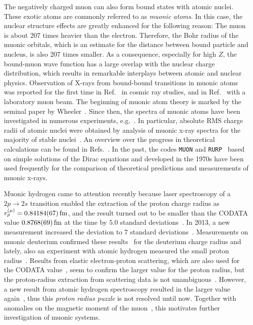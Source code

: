 The negatively charged muon can also form bound states with atomic nuclei. These exotic atoms are commonly referred to as \textit{muonic atoms}. In this case, the nuclear structure effects are greatly enhanced for the following reason: The muon is about 207 times heavier than the electron. Therefore, the Bohr radius of the muonic orbitals, which is an estimate for the distance between bound particle and nucleus, is also 207 times smaller. As a consequence, especially for high $Z$, the bound-muon wave function has a large overlap with the nuclear charge distribution, which results in remarkable interplays between atomic and nuclear physics. Observation of X-rays from bound-bound transitions in muonic atoms was reported for the first time in Ref.~\cite{chang1949} in cosmic ray studies, and in Ref.~\cite{fitch1953} with a laboratory muon beam. The beginning of muonic atom theory is marked by the seminal paper by Wheeler~\cite{wheeler1949}.  Since then, the spectra of muonic atoms have been investigated in numerous experiments, e.g.~\cite{hitlin1970,zehnder1975,powers1976,Yamazaki1978,tanaka1983,tanaka1984,tanaka1984_2,Bergem1988,
powers1977}. In particular, absolute RMS charge radii of atomic nuclei were obtained by analysis of muonic x-ray spectra for the majority of stable nuclei~\cite{FRICKE1995}. An overview over the progress in theoretical calculations can be found in Refs.~\cite{BorieRinker1982,Devons1995,wu1969}. In the past, the codes \texttt{MUON} and \texttt{RURP}~\cite{rinker1979} based on simple solutions of the Dirac equations and developed in the 1970s have been used frequently for the comparison of theoretical predictions and measurements of muonic x-rays. 

Muonic hydrogen came to attention recently because laser spectroscopy of a \mbox{\small{$2p\rightarrow 2s$}} transition enabled the extraction of the proton charge radius as $r_p^{(\mu)}=0.84184(67)\,\rm{fm}$, and the result turned out to be smaller than the CODATA value $0.8768(69)\,\rm{fm}$ at the time by $5.0$ standard deviations~\cite{Pohl2010}. In 2013, a new measurement increased the deviation to 7 standard deviations~\cite{antognini2013}. Measurements on muonic deuterium confirmed these results~\cite{pohl2016} for the deuterium charge radius and lately, also an experiment with atomic hydrogen measured the small proton radius~\cite{beyer2017}.
Results from elastic electron-proton scattering, which are also used for the CODATA value~\cite{codata}, seem to confirm the larger value for the proton radius, but the proton-radius extraction from scattering data is not unambiguous~\cite{arrington2015}. However, a new result from atomic hydrogen spectroscopy resulted in the larger value again~\cite{fleurbaey2018}, thus this \textit{proton radius puzzle} is not resolved until now. Together with anomalies on the magnetic moment of the muon~\cite{bennett2006}, this motivates further investigation of muonic systems.

